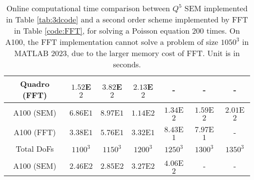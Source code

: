 \documentclass{article}
\begin{document}
\begin{table}[ht!]
\begin{tabular}{|c|c|c|c|c|c|c|}
    \hline
         Quadro (FFT) & $1.52$E$2$ & $3.82$E$2$ & $2.13$E$2$ & - & - & -\\
    \hline
         A100 (SEM) & $6.86$E$1$ & $8.97$E$1$ & $1.14$E$2$ & $1.34$E$2$ & $1.59$E$2$ &
         $2.01$E$2$\\
    \hline
         A100 (FFT) & $3.38$E$1$ & $5.76$E$1$ & $3.32$E$1$ & $8.43$E$1$ & $7.97$E$1$ & -\\
    \hline
    \hline
         Total DoFs & $1100^3$ & $1150^3$ & $1200^3$ & $1250^3$ & $1300^3$ & $1350^3$\\
    \hline
         A100 (SEM) & $2.46$E$2$ & $2.85$E$2$ & $3.27$E$2$ & $4.06$E$2$ & - & -\\
    \hline
    \end{tabular}
    \caption{Online computational time comparison between $Q^5$ SEM implemented in Table \ref{tab:3dcode} and a second order scheme implemented by FFT in Table \ref{code:FFT}, for solving a Poisson equation 200 times. On A100, the FFT implementation cannot solve a problem of size $1050^3$ in MATLAB 2023, due to the larger memory cost of FFT.  Unit is in seconds.}
    \label{tab4: poisson_FFT_SEM}
\end{table}
\end{document}
